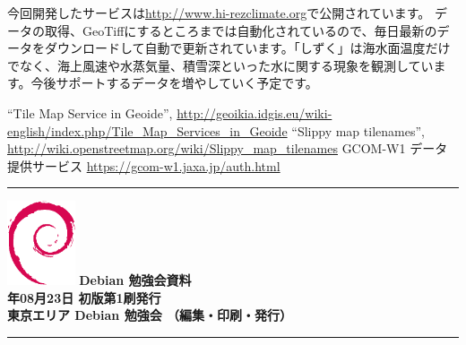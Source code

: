 \documentclass[mingoth,a4paper]{jsarticle}
\newcommand{\debmtgyear}{2014}
\newcommand{\debmtgmonth}{08}
\newcommand{\debmtgdate}{23}
\begin{document}
今回開発したサービスは\url{http://www.hi-rezclimate.org}で公開されています。
データの取得、GeoTiffにするところまでは自動化されているので、毎日最新のデータをダウンロードして自動で更新されています。「しずく」は海水面温度だけでなく、海上風速や水蒸気量、積雪深といった水に関する現象を観測しています。今後サポートするデータを増やしていく予定です。



\begin{thebibliography}{9}
``Tile Map Service in Geoide'', \url{http://geoikia.idgis.eu/wiki-english/index.php/Tile\_Map\_Services\_in\_Geoide}
 ``Slippy map tilenames'', \url{http://wiki.openstreetmap.org/wiki/Slippy\_map\_tilenames}
 GCOM-W1 データ提供サービス \url{https://gcom-w1.jaxa.jp/auth.html}
\end{thebibliography}
\printindex

\cleartooddpage

\vspace*{15cm}
\hrule
\vspace{2mm}
\includegraphics[width=2cm]{image200502/openlogo-nd.eps}
\noindent \Large \bf Debian 勉強会資料\\
\noindent \normalfont \debmtgyear{}年\debmtgmonth{}月\debmtgdate{}日 \hspace{5mm}  初版第1刷発行\\
\noindent \normalfont 東京エリア Debian 勉強会 （編集・印刷・発行）\\
\hrule
\end{document}
